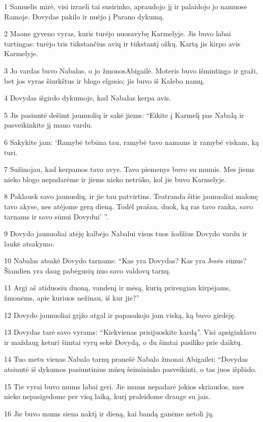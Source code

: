 \par 1 Samuelis mirė, visi izraeli tai susirinko, apraudojo jį ir palaidojo jo namuose Ramoje. Dovydas pakilo ir nuėjo į Parano dykumą. 
\par 2 Maone gyveno vyras, kuris turėjo nuosavybę Karmelyje. Jis buvo labai turtingas: turėjo tris tūkstančius avių ir tūkstantį ožkų. Kartą jis kirpo avis Karmelyje. 
\par 3 Jo vardas buvo Nabalas, o jo žmonos­Abigailė. Moteris buvo išmintinga ir graži, bet jos vyras šiurkštus ir blogo elgesio; jis buvo iš Kalebo namų. 
\par 4 Dovydas išgirdo dykumoje, kad Nabalas kerpa avis. 
\par 5 Jis pasiuntė dešimt jaunuolių ir sakė jiems: “Eikite į Karmelį pas Nabalą ir pasveikinkite jį mano vardu. 
\par 6 Sakykite jam: ‘Ramybė tebūna tau, ramybė tavo namams ir ramybė viskam, ką turi. 
\par 7 Sužinojau, kad kerpamos tavo avys. Tavo piemenys buvo su mumis. Mes jiems nieko blogo nepadarėme ir jiems nieko netrūko, kol jie buvo Karmelyje. 
\par 8 Paklausk savo jaunuolių, ir jie tau patvirtins. Teatranda šitie jaunuoliai malonę tavo akyse, nes atėjome gerą dieną. Todėl prašau, duok, ką ras tavo ranka, savo tarnams ir savo sūnui Dovydui’ ”. 
\par 9 Dovydo jaunuoliai atėję kalbėjo Nabalui visus tuos žodžius Dovydo vardu ir laukė atsakymo. 
\par 10 Nabalas atsakė Dovydo tarnams: “Kas yra Dovydas? Kas yra Jesės sūnus? Šiandien yra daug pabėgusių nuo savo valdovų tarnų. 
\par 11 Argi aš atiduosiu duoną, vandenį ir mėsą, kurią prirengiau kirpėjams, žmonėms, apie kuriuos nežinau, iš kur jie?” 
\par 12 Dovydo jaunuoliai grįžo atgal ir papasakojo jam viską, ką buvo girdėję. 
\par 13 Dovydas tarė savo vyrams: “Kiekvienas prisijuoskite kardą”. Visi apsiginklavo ir maždaug keturi šimtai vyrų sekė Dovydą, o du šimtai pasiliko prie daiktų. 
\par 14 Tuo metu vienas Nabalo tarnų pranešė Nabalo žmonai Abigailei: “Dovydas atsiuntė iš dykumos pasiuntinius mūsų šeimininko pasveikinti, o tas juos išplūdo. 
\par 15 Tie vyrai buvo mums labai geri. Jie mums nepadarė jokios skriaudos, mes nieko nepasigedome per visą laiką, kurį praleidome drauge su jais. 
\par 16 Jie buvo mums siena naktį ir dieną, kai bandą ganėme netoli jų. 
